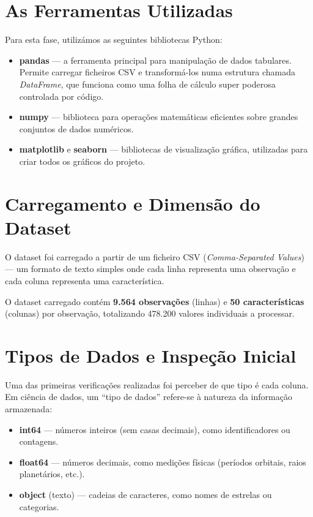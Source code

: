 \documentclass[12pt, a4paper]{report}
\begin{document}
\section{As Ferramentas Utilizadas}

Para esta fase, utilizámos as seguintes bibliotecas Python:

\begin{itemize}
    \item \textbf{pandas} — a ferramenta principal para manipulação de dados tabulares. Permite carregar ficheiros CSV e transformá-los numa estrutura chamada \textit{DataFrame}, que funciona como uma folha de cálculo super poderosa controlada por código.

    \item \textbf{numpy} — biblioteca para operações matemáticas eficientes sobre grandes conjuntos de dados numéricos.

    \item \textbf{matplotlib} e \textbf{seaborn} — bibliotecas de visualização gráfica, utilizadas para criar todos os gráficos do projeto.
\end{itemize}

\section{Carregamento e Dimensão do Dataset}

O dataset foi carregado a partir de um ficheiro CSV (\textit{Comma-Separated Values}) — um formato de texto simples onde cada linha representa uma observação e cada coluna representa uma característica.

\begin{caixaresultado}
O dataset carregado contém \textbf{9.564 observações} (linhas) e \textbf{50 características} (colunas) por observação, totalizando 478.200 valores individuais a processar.
\end{caixaresultado}

\section{Tipos de Dados e Inspeção Inicial}

Uma das primeiras verificações realizadas foi perceber de que tipo é cada coluna. Em ciência de dados, um ``tipo de dados'' refere-se à natureza da informação armazenada:

\begin{itemize}
    \item \textbf{int64} — números inteiros (sem casas decimais), como identificadores ou contagens.
    \item \textbf{float64} — números decimais, como medições físicas (períodos orbitais, raios planetários, etc.).
    \item \textbf{object} (texto) — cadeias de caracteres, como nomes de estrelas ou categorias.
\end{itemize}
\end{document}
